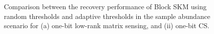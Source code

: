 \documentclass[12pt,draftcls,onecolumn]{IEEEtran}
\begin{document}
\begin{figure}[t]
	\centering
	\caption{Comparison between the recovery performance of Block SKM using random thresholds and adaptive thresholds in the sample abundance scenario for (a) one-bit low-rank matrix sensing, and (ii) one-bit CS.
  \vspace{-15pt}
 }
	\label{figure_2}
\end{figure}
\end{document}
